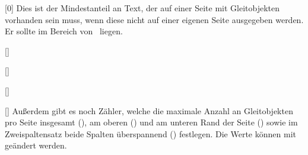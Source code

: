 \begin{Declaration}{}[0\textfraction]
\printdeclarationlist*%
%
Dies ist der Mindestanteil an Text, der auf einer Seite mit Gleitobjekten 
vorhanden sein muss, wenn diese nicht auf einer eigenen Seite ausgegeben 
werden. Er sollte im Bereich von~ liegen.
\end{Declaration}

\begin{Declaration}{}[]
\begin{Declaration}{}[]
\begin{Declaration}{}[]
\begin{Declaration}{}[]
\printdeclarationlist*%
%
Außerdem gibt es noch Zähler, welche die maximale Anzahl an Gleitobjekten pro 
Seite insgesamt (), am oberen () und 
am unteren Rand der Seite () sowie im Zweispaltensatz 
beide Spalten überspannend () festlegen. Die Werte 
können mit  geändert 
werden.
\end{Declaration}
\end{Declaration}
\end{Declaration}
\end{Declaration}

